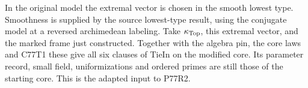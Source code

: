 In the original model the extremal vector is chosen in the
smooth lowest type. Smoothness is supplied by the source
lowest-type result, using the conjugate model at a reversed
archimedean labeling. Take $\kappa_{\rm Top}$, this extremal
vector, and the marked frame just constructed. Together with the
algebra pin, the core laws and C77T1 these give all six clauses
of $\mathrm{TieIn}$ on the modified core. Its parameter record,
small field, uniformizations and ordered primes are still those
of the starting core. This is the adapted input to P77R2.
